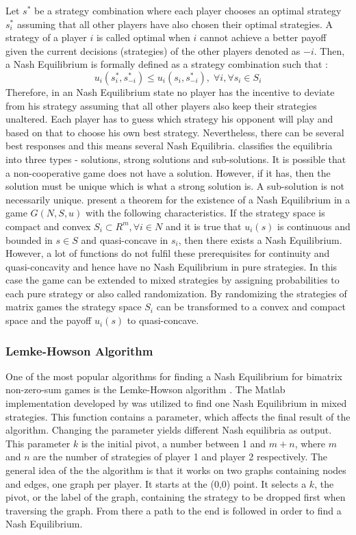 {Let $s^*$ be a strategy combination where each player chooses an optimal strategy $s_i^*$ assuming that all other players have also chosen their optimal strategies. A strategy of a player $i$ is called optimal when $i$ cannot achieve a better payoff given the current decisions (strategies) of the other players denoted as $-i$. Then, a Nash Equilibrium is formally defined as a strategy combination such that \citep{holler2006einfuhrung}:
\begin{equation}
u_i(s_i^*, s_{-i}^*) \leq u_i(s_i,s_{-i}^*), \; \forall i, \forall s_i \in S_i
\end{equation}
Therefore, in an Nash Equilibrium state no player has the incentive to deviate from his strategy assuming that all other players also keep their strategies unaltered. Each player has to guess which strategy his opponent will play and based on that to choose his own best strategy. Nevertheless, there can be several best responses and this means several Nash Equilibria. \citet{nash1950equilibrium} classifies the equilibria into three types - solutions, strong solutions and sub-solutions. It is possible that a non-cooperative game does not have a solution. However, if it has, then the solution must be unique which is what a strong solution is. A sub-solution is not necessarily unique. \citet{holler2006einfuhrung} present a theorem for the existence of a Nash Equilibrium in a game $G(N,S,u)$ with the following characteristics. If the strategy space is compact and convex $S_i \subset R^m, \forall i \in N$ and it is true that $u_i(s)$ is continuous and bounded in $s \in S$ and quasi-concave in $s_i$, then there exists a Nash Equilibrium. However, a lot of functions do not fulfil these prerequisites for continuity and quasi-concavity and hence have no Nash Equilibrium in pure strategies. In this case the game can be extended to mixed strategies by assigning probabilities to each pure strategy or also called randomization. By randomizing the strategies of matrix games the strategy space $S_i$ can be transformed to a convex and compact space and the payoff $u_i(s)$ to quasi-concave.  

\subsubsection{Lemke-Howson Algorithm}
\label{subsubsec:lemkehowson}
One of the most popular algorithms for finding a Nash Equilibrium for bimatrix non-zero-sum games is the Lemke-Howson algorithm \citep{lemke1964equilibrium}. The Matlab implementation developed by \citet{lemkeHowson2014Matlab} was utilized to find one Nash Equilibrium in mixed strategies. This function contains a parameter, which affects the final result of the algorithm. Changing the parameter yields different Nash equilibria as output. This parameter $k$ is the initial pivot, a number between 1 and $m+n$, where $m$ and $n$ are the number of strategies of player 1 and player 2 respectively. The general idea of the the algorithm is that it works on two graphs containing nodes and edges, one graph per player. It starts at the (0,0) point. It selects a $k$, the pivot, or the label of the graph, containing the strategy to be dropped first when traversing the graph. From there a path to the end is followed in order to find a Nash Equilibrium. 

}
